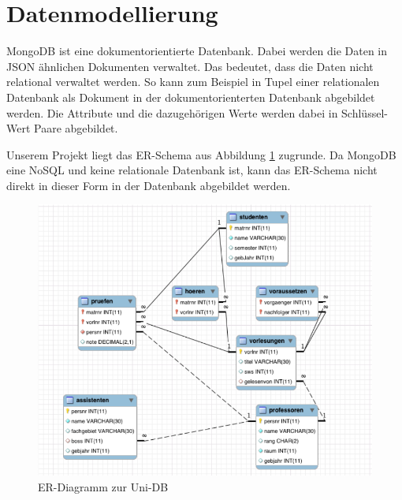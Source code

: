 \section{Datenmodellierung}
MongoDB ist eine dokumentorientierte Datenbank. Dabei werden die Daten in JSON
ähnlichen Dokumenten verwaltet. Das bedeutet, dass die Daten nicht relational
verwaltet werden. So kann zum Beispiel in Tupel einer relationalen Datenbank
als Dokument in der dokumentorienterten Datenbank abgebildet werden. Die
Attribute und die dazugehörigen Werte werden dabei in Schlüssel-Wert Paare
abgebildet. 

Unserem Projekt liegt das ER-Schema aus Abbildung \ref{fig:uni-db}
zugrunde.
Da MongoDB eine NoSQL und keine relationale Datenbank ist, kann das ER-Schema nicht direkt
in dieser Form in der Datenbank abgebildet werden. 

\begin{figure}[h] 
	\centering
		\includegraphics[width=1\textwidth]{./pictures/SQL-DB_ER_Diagramm_UNI-DB.png}
	\caption{ER-Diagramm zur Uni-DB \cite{Kaufmann2016}}
	\label{fig:uni-db}
\end{figure}

